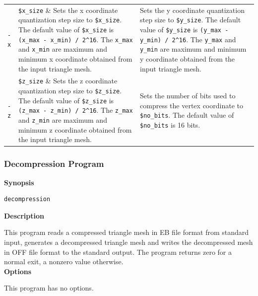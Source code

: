 \documentclass[onecolumn, 12pt]{article}
\begin{document}
\begin{tabular}{l l p{}}
\lstinline !-x! & \lstinline !$x_size! & Sets the x coordinate quantization step size to \lstinline !$x_size!. The default value of \lstinline !$x_size! is \lstinline !(x_max - x_min) / 2^16!. The \lstinline !x_max! and \lstinline !x_min! are maximum and minimum x coordinate obtained from the input triangle mesh. \\
\lstinline !-y! & \lstinline !$y_size! & Sets the y coordinate quantization step size to \lstinline !$y_size!. The default value of \lstinline !$y_size! is \lstinline !(y_max - y_min) / 2^16!. The \lstinline !y_max! and \lstinline !y_min! are maximum and minimum y coordinate obtained from the input triangle mesh. \\
\lstinline !-z! & \lstinline !$z_size! & Sets the z coordinate quantization step size to \lstinline !$z_size!. The default value of \lstinline !$z_size! is \lstinline !(z_max - z_min) / 2^16!. The \lstinline !z_max! and \lstinline !z_min! are maximum and minimum z coordinate obtained from the input triangle mesh. \\
\lstinline !-b! & \lstinline !$no_bits! & Sets the number of bits used to compress the vertex coordinate to \lstinline !$no_bits!. The default value of \lstinline !$no_bits! is 16 bits.  \\
\end{tabular}
\label{tab:compressCLI}



\subsubsection{Decompression Program}
\textbf{Synopsis}
\begin{lstlisting}
decompression
\end{lstlisting}


{\setlength\parindent{0pt}
\textbf{Description}\vspace{0.5em}}

This program reads a compressed triangle mesh in EB file format from standard input, generates a decompressed triangle mesh and writes the decompressed mesh in OFF file format to the standard output. The program returns zero for a normal exit, a nonzero value otherwise.\\


{\setlength\parindent{0pt}
\textbf{Options}\vspace{0.5em}}

This program has no options.
\end{document}
